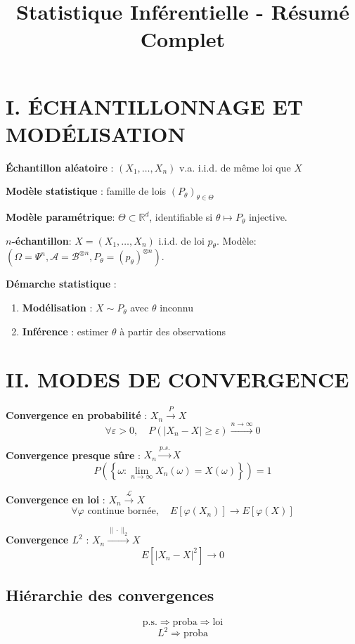 \documentclass[8pt,twocolumn]{article}
\newcommand{\mydef}[1]{\textcolor{defcolor}{\textbf{#1}}}
\newcommand{\myprop}[1]{\textcolor{propcolor}{\textbf{#1}}}
\newcommand{\R}{\mathbb{R}}
\begin{document}
\title{\textbf{Statistique Inférentielle - Résumé Complet}}
\date{}
\maketitle

\section*{\mydef{I. ÉCHANTILLONNAGE ET MODÉLISATION}}

\textbf{Échantillon aléatoire} : $(X_1,\ldots,X_n)$ v.a. i.i.d. de même loi que $X$

\textbf{Modèle statistique} : famille de lois $(P_\theta)_{\theta \in \Theta}$

\mydef{Modèle paramétrique}: $\Theta \subset \R^d$, identifiable si $\theta \mapsto P_\theta$ injective.

\mydef{$n$-échantillon}: $X=(X_1,\dots,X_n)$ i.i.d. de loi $p_\theta$. Modèle: $(\Omega=\Psi^n, \mathcal{A}=\mathcal{B}^{\otimes n}, P_\theta=(p_\theta)^{\otimes n})$.

\textbf{Démarche statistique} :
\begin{enumerate}[nosep]
\item \mydef{Modélisation} : $X \sim P_\theta$ avec $\theta$ inconnu
\item \mydef{Inférence} : estimer $\theta$ à partir des observations
\end{enumerate}

\section*{\mydef{II. MODES DE CONVERGENCE}}

\textbf{Convergence en probabilité} : $X_n \xrightarrow{P} X$
$$\forall \varepsilon > 0, \quad P(|X_n - X| \geq \varepsilon) \xrightarrow{n \to \infty} 0$$

\textbf{Convergence presque sûre} : $X_n \xrightarrow{p.s.} X$
$$P\left(\left\{\omega : \lim_{n \to \infty} X_n(\omega) = X(\omega)\right\}\right) = 1$$

\textbf{Convergence en loi} : $X_n \xrightarrow{\mathcal{L}} X$
$$\forall \varphi \text{ continue bornée}, \quad E[\varphi(X_n)] \to E[\varphi(X)]$$

\textbf{Convergence $L^2$} : $X_n \xrightarrow{\|\cdot\|_2} X$
$$E[|X_n - X|^2] \to 0$$

\subsection{\myprop{Hiérarchie des convergences}}
$$\text{p.s.} \Rightarrow \text{proba} \Rightarrow \text{loi}$$
$$L^2 \Rightarrow \text{proba}$$
\end{document}
